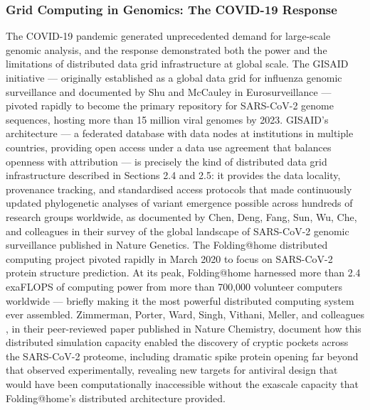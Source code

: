 \documentclass[12pt,a4paper]{report}
\begin{document}
  \subsubsection{Grid Computing in Genomics: The COVID-19 Response}
  The COVID-19 pandemic generated unprecedented demand for large-scale genomic analysis, and the response demonstrated both the power 
  and the limitations of distributed data grid infrastructure at global scale. The GISAID initiative — originally established as a global 
  data grid for influenza genomic surveillance and documented by Shu and McCauley \parencite{shu2017gisaid} in Eurosurveillance — pivoted rapidly to become
   the primary repository for SARS-CoV-2 genome sequences, hosting more than 15 million viral genomes by 2023. GISAID’s architecture — a 
   federated database with data nodes at institutions in multiple countries, providing open access under a data use agreement that balances 
   openness with attribution — is precisely the kind of distributed data grid infrastructure described in Sections 2.4 and 2.5: it provides
    the data locality, provenance tracking, and standardised access protocols that made continuously updated phylogenetic analyses of variant
     emergence possible across hundreds of research groups worldwide, as documented by Chen, Deng, Fang, Sun, Wu, Che, and colleagues \parencite{chen2022global} 
     in their survey of the global landscape of SARS-CoV-2 genomic surveillance published in Nature Genetics. The Folding@home distributed 
     computing project pivoted rapidly in March 2020 to focus on SARS-CoV-2 protein structure prediction. At its peak, Folding@home harnessed
      more than 2.4 exaFLOPS of computing power from more than 700,000 volunteer computers worldwide — briefly making it the most powerful 
      distributed computing system ever assembled. Zimmerman, Porter, Ward, Singh, Vithani, Meller, and colleagues \parencite{zimmerman2021exascale}, in their peer-reviewed
       paper published in Nature Chemistry, document how this distributed simulation capacity enabled the discovery of cryptic pockets across the 
       SARS-CoV-2 proteome, including dramatic spike protein opening far beyond that observed experimentally, revealing new targets for antiviral 
       design that would have been computationally inaccessible without the exascale capacity that Folding@home’s distributed architecture provided.
\end{document}
